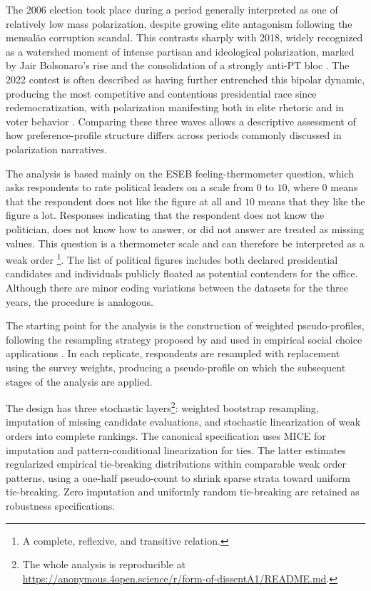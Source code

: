 \documentclass[12pt]{article}
\begin{document}
The 2006 election took place during a period generally interpreted as one of
relatively low mass polarization, despite growing elite antagonism following the
mensalão corruption scandal. This contrasts sharply with 2018, widely recognized
as a watershed moment of intense partisan and ideological polarization, marked
by Jair Bolsonaro’s rise and the consolidation of a strongly anti-PT bloc
\parencite{samuels23_partis_stereot_polar_brazil}. The 2022 contest is often described as having further entrenched this
bipolar dynamic, producing the most competitive and contentious presidential
race since redemocratization, with polarization manifesting both in elite
rhetoric and in voter behavior \parencite{nunes2023biografia}. Comparing these three waves allows a
descriptive assessment of how preference-profile structure differs across
periods commonly discussed in polarization narratives.

The analysis is based mainly on the ESEB feeling-thermometer question, which
asks respondents to rate political leaders on a scale from \(0\) to \(10\),
where \(0\) means that the respondent does not like the figure at all and \(10\)
means that they like the figure a lot. Responses indicating that the respondent
does not know the politician, does not know how to answer, or did not answer are
treated as missing values. This question is a thermometer scale and can
therefore be interpreted as a weak order \parencite{regenwetter2006behavioral}\footnote{A complete, reflexive, and transitive relation.}. The list of political
figures includes both declared presidential candidates and individuals publicly
floated as potential contenders for the office. Although there are minor coding
variations between the datasets for the three years, the procedure is analogous.


The starting point for the analysis is the construction of weighted
pseudo-profiles, following the resampling strategy proposed by
\textcite{popov2014consensus} and used in empirical social choice applications
\parencite{kaminski2015empirical,
lachat24_alter_to_plural_rule_singl_winner_elect, maciel2024bolsonaro}. In each
replicate, respondents are resampled with replacement using the survey weights,
producing a pseudo-profile on which the subsequent stages of the analysis are
applied.

The design has three stochastic layers\footnote{The whole analysis is
  reproducible at
  \url{https://anonymous.4open.science/r/form-of-dissentA1/README.md}.}:
weighted bootstrap resampling, imputation of missing candidate evaluations, and
stochastic linearization of weak orders into complete rankings. The canonical
specification uses MICE for imputation and pattern-conditional linearization for
ties. The latter estimates regularized empirical tie-breaking distributions
within comparable weak order patterns, using a one-half pseudo-count to shrink
sparse strata toward uniform tie-breaking. Zero imputation and uniformly random
tie-breaking are retained as robustness specifications.
\end{document}
